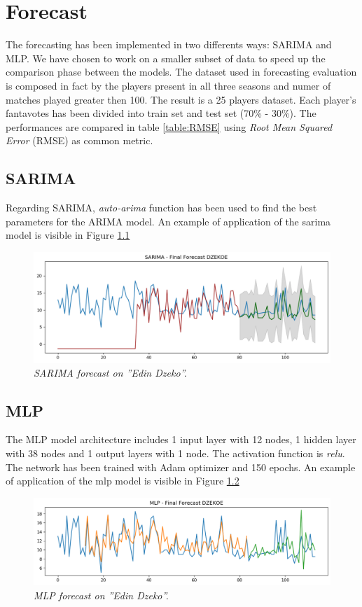 \chapter {Forecast}

The forecasting has been implemented in two differents ways: SARIMA and MLP.
We have chosen to work on a smaller subset of data to speed up the comparison phase between the models.
The dataset used in forecasting evaluation is composed in fact by the players present in all three seasons and numer of matches played greater then 100.
The result is a 25 players dataset. 
Each player's fantavotes has been divided into train set and test set (70\% - 30\%).
The performances are compared in table \ref{table:RMSE} using \textit{Root Mean Squared Error} (RMSE) as common metric.

\section{SARIMA}

Regarding SARIMA, \textit{auto-arima} function has been used to find the best parameters for the ARIMA model.
An example of application of the sarima model is visible in Figure \ref{fig:sarima}


\begin{figure}[H]
  \includegraphics[scale=0.5]{images/dzeko_sarima_fantavoti.png}
   \caption{\textit{SARIMA forecast on ''Edin Dzeko''.}}
  \label{fig:sarima}
\end{figure}

\section{MLP}
The MLP model architecture includes 1 input layer with 12 nodes, 1 hidden layer with 38 nodes and 1 output layers with 1 node. The activation function is \textit{relu}.
The network has been trained with Adam optimizer and 150 epochs.
An example of application of the mlp model is visible in Figure \ref{fig:mlp}
\begin{figure}[H]
  \includegraphics[scale=0.5]{images/dzeko_mlp_fantavoti.png}
   \caption{\textit{MLP forecast on ''Edin Dzeko''.}}
  \label{fig:mlp}
\end{figure}

